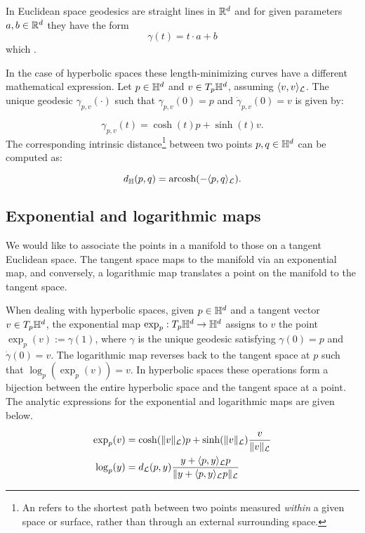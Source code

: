 In Euclidean space geodesics are straight lines in $\mathbb{R}^d$ and for given parameters $a,b\in \mathbb{R}^d$ they have the form 
\begin{equation}
    \gamma(t) = t\cdot a + b
\end{equation}
which . 

In the case of hyperbolic spaces these length-minimizing curves have a different mathematical expression. Let $p\in\mathbb{H}^d$ and $v\in T_p\mathbb{H}^d$, assuming $\langle v,v\rangle_{\mathcal{L}} $. The unique geodesic $\gamma_{p,v}(\cdot)$ such that $\gamma_{p,v}(0)=p$ and $\dot{\gamma}_{p,v}(0)=v$ is given by:

\begin{equation*}
    \gamma_{p,v}(t) = \cosh(t)p + \sinh(t)v.
\end{equation*}
The corresponding intrinsic distance\footnote{An  refers to the shortest path between two points measured \emph{within} a given space or surface, rather than through an external surrounding space.}  between two points $p,q\in\mathbb{H}^d$ can be computed as:

\begin{equation*}
    d_{\mathbb{H}}(p, q) = \text{arcosh}(-\langle p, q \rangle_{\mathcal{L}}).
\end{equation*}

\subsection{Exponential and logarithmic maps}\label{sec:expLogMaps}
We would like to associate the points in a manifold to those on a tangent Euclidean space. The tangent space maps to the manifold via an exponential map, and conversely, a logarithmic map translates a point on the manifold to the tangent space. 

When dealing with hyperbolic spaces, given $p \in \mathbb{H}^d$ and a tangent vector $v \in T_p\mathbb{H}^d$, the exponential map $\exp_p: T_p\mathbb{H}^d \to \mathbb{H}^d$ assigns to $v$ the point $\exp_p(v) := \gamma(1)$, where $\gamma$ is the unique geodesic satisfying $\gamma(0) = p$ and $\dot{\gamma}(0) = v$. The logarithmic map reverses back to the tangent space at $p$ such that $\log_p(\exp_p(v)) = v$. In hyperbolic spaces these operations form a bijection between the entire hyperbolic space and the tangent space at a point. The analytic expressions for the exponential and logarithmic maps are given below.

\begin{align*}
    \exp_p(v) &= \cosh(\|v\|_{\mathcal{L}})p + \sinh(\|v\|_{\mathcal{L}}) \frac{v}{\|v\|_{\mathcal{L}}}\\
    \log_p(y) &= d_{\mathcal{L}}(p,y)\frac{y + \langle p,y \rangle_{\mathcal{L}}p}{\|y + \langle p,y \rangle_{\mathcal{L}}p\|_{\mathcal{L}}}
\end{align*}

